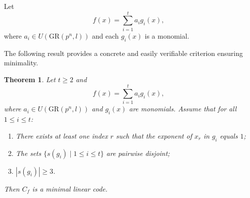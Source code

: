 \documentclass[10pt]{article}
\newtheorem{theorem}[lem]{Theorem}
\theoremstyle{definition}
\begin{document}
Let
\[
f(x)=\sum_{i=1}^{t} a_i g_i(x),
\]
where $a_i\in U(\mathrm{GR}(p^n,l))$
and each $g_i(x)$ is a monomial.

The following result provides a concrete and easily verifiable
criterion ensuring minimality.

\begin{theorem}
Let $t\ge 2$ and
\[
f(x)=\sum_{i=1}^{t} a_i g_i(x),
\]
where $a_i\in U(\mathrm{GR}(p^n,l))$
and $g_i(x)$ are monomials.
Assume that for all $1\le i\le t$:

\begin{enumerate}
\item There exists at least one index $r$ such that
      the exponent of $x_r$ in $g_i$ equals $1$;

\item The sets $\{s(g_i)\mid 1\le i\le t\}$ are pairwise disjoint;

\item $|s(g_i)|\ge 3$.
\end{enumerate}

Then $C_f$ is a minimal linear code.
\end{theorem}
\end{document}
